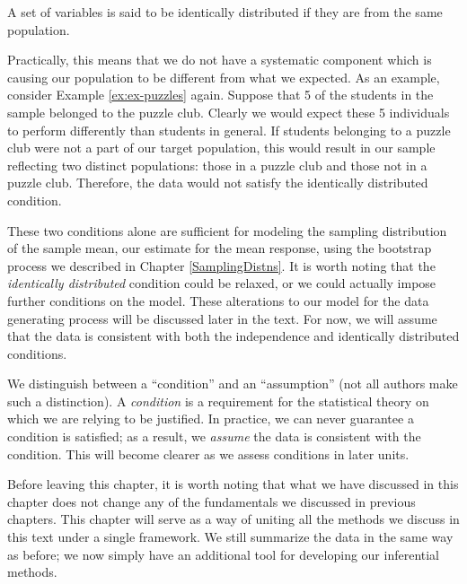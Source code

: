 \documentclass[]{book}
\theoremstyle{plain}
\theoremstyle{mydefn}
\theoremstyle{myexmpl}
\theoremstyle{remark}
\let\BeginKnitrBlock\begin \let\EndKnitrBlock\end
\let\BeginKnitrBlock\begin \let\EndKnitrBlock\end
\begin{document}
\BeginKnitrBlock{definition}[Identically Distributed]
\protect\hypertarget{def:defn-identically-distributed}{}{\label{def:defn-identically-distributed}
{} }A set of variables is said to
be identically distributed if they are from the same population.
\EndKnitrBlock{definition}

Practically, this means that we do not have a systematic component which
is causing our population to be different from what we expected. As an
example, consider Example \ref{ex:ex-puzzles} again. Suppose that 5 of
the students in the sample belonged to the puzzle club. Clearly we would
expect these 5 individuals to perform differently than students in
general. If students belonging to a puzzle club were not a part of our
target population, this would result in our sample reflecting two
distinct populations: those in a puzzle club and those not in a puzzle
club. Therefore, the data would not satisfy the identically distributed
condition.

These two conditions alone are sufficient for modeling the sampling
distribution of the sample mean, our estimate for the mean response,
using the bootstrap process we described in Chapter
\ref{SamplingDistns}. It is worth noting that the \emph{identically
distributed} condition could be relaxed, or we could actually impose
further conditions on the model. These alterations to our model for the
data generating process will be discussed later in the text. For now, we
will assume that the data is consistent with both the independence and
identically distributed conditions.

\BeginKnitrBlock{rmdtip}
We distinguish between a ``condition'' and an ``assumption'' (not all
authors make such a distinction). A \emph{condition} is a requirement
for the statistical theory on which we are relying to be justified. In
practice, we can never guarantee a condition is satisfied; as a result,
we \emph{assume} the data is consistent with the condition. This will
become clearer as we assess conditions in later units.
\EndKnitrBlock{rmdtip}

Before leaving this chapter, it is worth noting that what we have
discussed in this chapter does not change any of the fundamentals we
discussed in previous chapters. This chapter will serve as a way of
uniting all the methods we discuss in this text under a single
framework. We still summarize the data in the same way as before; we now
simply have an additional tool for developing our inferential methods.
\end{document}

